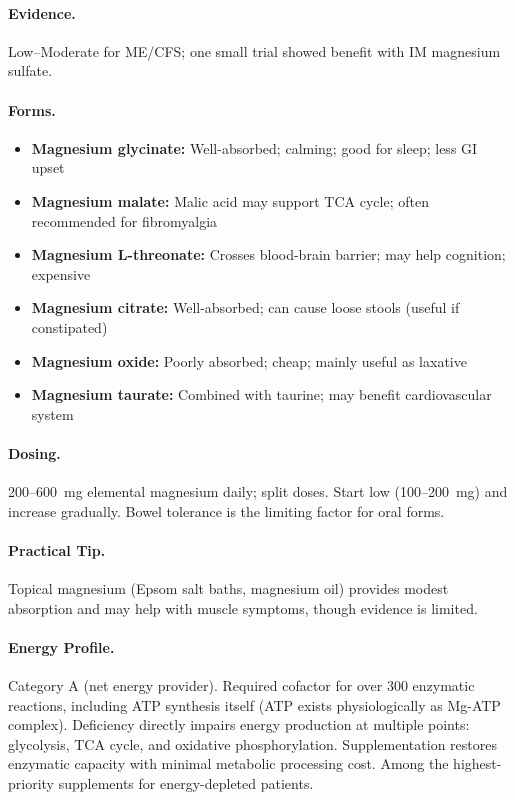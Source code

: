 \paragraph{Evidence.} Low--Moderate for ME/CFS; one small trial showed benefit with IM magnesium sulfate.

\paragraph{Forms.}
\begin{itemize}
    \item \textbf{Magnesium glycinate:} Well-absorbed; calming; good for sleep; less GI upset
    \item \textbf{Magnesium malate:} Malic acid may support TCA cycle; often recommended for fibromyalgia
    \item \textbf{Magnesium L-threonate:} Crosses blood-brain barrier; may help cognition; expensive
    \item \textbf{Magnesium citrate:} Well-absorbed; can cause loose stools (useful if constipated)
    \item \textbf{Magnesium oxide:} Poorly absorbed; cheap; mainly useful as laxative
    \item \textbf{Magnesium taurate:} Combined with taurine; may benefit cardiovascular system
\end{itemize}

\paragraph{Dosing.} 200--600~mg elemental magnesium daily; split doses. Start low (100--200~mg) and increase gradually. Bowel tolerance is the limiting factor for oral forms.

\paragraph{Practical Tip.} Topical magnesium (Epsom salt baths, magnesium oil) provides modest absorption and may help with muscle symptoms, though evidence is limited.

\paragraph{Energy Profile.}
Category A (net energy provider). Required cofactor for over 300 enzymatic reactions, including ATP synthesis itself (ATP exists physiologically as Mg-ATP complex). Deficiency directly impairs energy production at multiple points: glycolysis, TCA cycle, and oxidative phosphorylation. Supplementation restores enzymatic capacity with minimal metabolic processing cost. Among the highest-priority supplements for energy-depleted patients.

